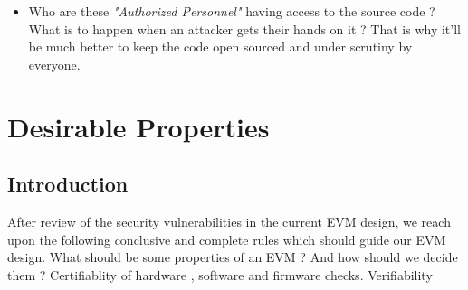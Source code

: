 \documentclass[12pt]{report}
\begin{document}
\begin{itemize}
  \label{sec:surv}
  \item Who are these \textit{"Authorized Personnel"} having access to the source code ? What is to happen when an attacker gets their hands on it ? That is why it'll be much better to keep the code open sourced and under scrutiny by everyone. 

\end{itemize}


\chapter{Desirable Properties}
\section{Introduction}
After review of the security vulnerabilities in the current EVM design, we reach upon the following conclusive and complete rules which should guide our EVM design.
What should be some properties of an EVM ? And how should we decide them ?
Certifiablity of hardware , software and firmware checks. Verifiability
\end{document}
